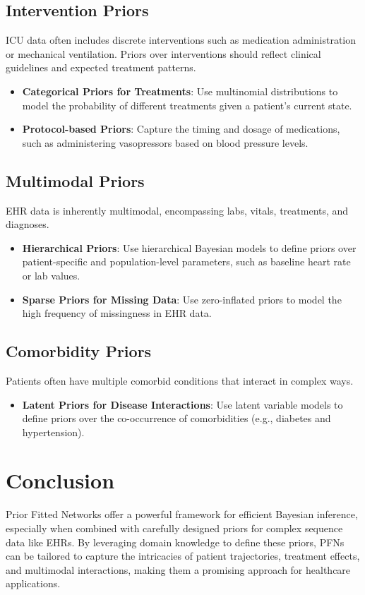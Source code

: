 \documentclass{article}
\begin{document}
\subsection{Intervention Priors}

ICU data often includes discrete interventions such as medication administration or mechanical ventilation. Priors over interventions should reflect clinical guidelines and expected treatment patterns.

\begin{itemize}
    \item \textbf{Categorical Priors for Treatments}: Use multinomial distributions to model the probability of different treatments given a patient's current state.
    \item \textbf{Protocol-based Priors}: Capture the timing and dosage of medications, such as administering vasopressors based on blood pressure levels.
\end{itemize}

\subsection{Multimodal Priors}

EHR data is inherently multimodal, encompassing labs, vitals, treatments, and diagnoses.

\begin{itemize}
    \item \textbf{Hierarchical Priors}: Use hierarchical Bayesian models to define priors over patient-specific and population-level parameters, such as baseline heart rate or lab values.
    \item \textbf{Sparse Priors for Missing Data}: Use zero-inflated priors to model the high frequency of missingness in EHR data.
\end{itemize}

\subsection{Comorbidity Priors}

Patients often have multiple comorbid conditions that interact in complex ways.

\begin{itemize}
    \item \textbf{Latent Priors for Disease Interactions}: Use latent variable models to define priors over the co-occurrence of comorbidities (e.g., diabetes and hypertension).
\end{itemize}

\section{Conclusion}

Prior Fitted Networks offer a powerful framework for efficient Bayesian inference, especially when combined with carefully designed priors for complex sequence data like EHRs. By leveraging domain knowledge to define these priors, PFNs can be tailored to capture the intricacies of patient trajectories, treatment effects, and multimodal interactions, making them a promising approach for healthcare applications.
\end{document}
